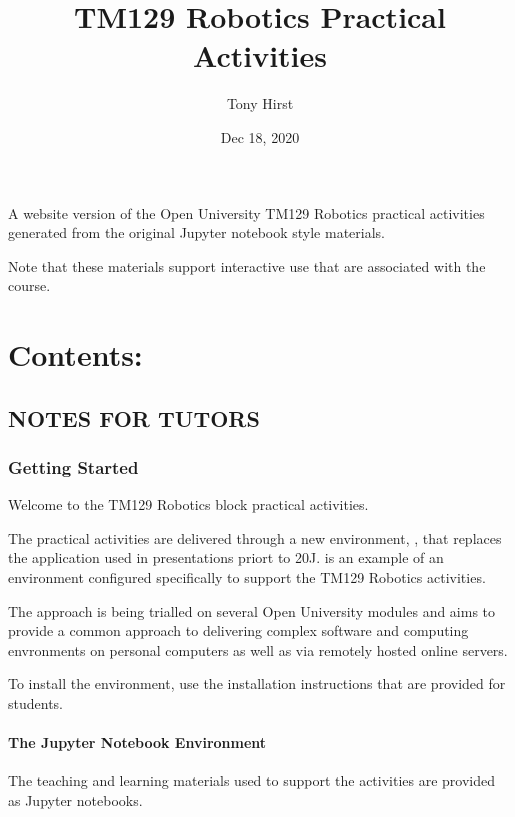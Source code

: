 \documentclass[letterpaper,10pt,english]{sphinxmanual}
\title{TM129 Robotics Practical Activities}
\date{Dec 18, 2020}
\author{Tony Hirst}
\begin{document}
\pagestyle{empty}
\sphinxmaketitle
\pagestyle{plain}
\sphinxtableofcontents
\pagestyle{normal}
\label{\detokenize{index::doc}}


A website version of the Open University TM129 Robotics practical activities generated
from the original Jupyter notebook style materials.

Note that these materials  support interactive use that are associated with the course.


\chapter{Contents:}
\label{\detokenize{index:contents}}

\section{NOTES FOR TUTORS}
\label{\detokenize{index:notes-for-tutors}}

\subsection{Getting Started}
\label{\detokenize{content/00_NOTES_FOR_TUTORS/GETTING_STARTED:Getting-Started}}\label{\detokenize{content/00_NOTES_FOR_TUTORS/GETTING_STARTED::doc}}
Welcome to the TM129 Robotics block practical activities.

The practical activities are delivered through a new environment, , that replaces the  application used in presentations priort to 20J.  is an example of an  environment configured specifically to support the TM129 Robotics activities.

The  approach is being trialled on several Open University modules and aims to provide a common approach to delivering complex software and computing envronments on personal computers as well as via remotely hosted online servers.

To install the environment, use the installation instructions that are provided for students.


\subsubsection{The Jupyter Notebook Environment}
\label{\detokenize{content/00_NOTES_FOR_TUTORS/GETTING_STARTED:The-Jupyter-Notebook-Environment}}
The teaching and learning materials used to support the activities are provided as Jupyter notebooks.
\end{document}
